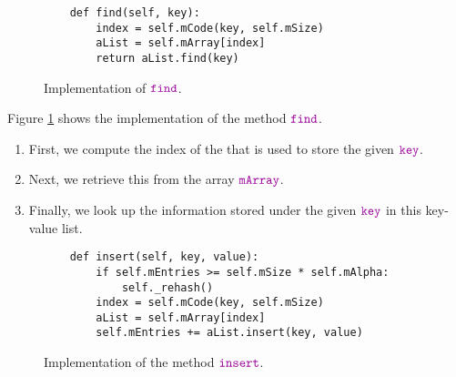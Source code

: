 \begin{figure}[!ht]
\centering
\begin{verbatim}
    def find(self, key):
        index = self.mCode(key, self.mSize)
        aList = self.mArray[index]
        return aList.find(key)
\end{verbatim}
\vspace*{-0.3cm}
\caption{Implementation of $\mytt{find}$.}
\label{fig:HashMap.ipynb-find}
\end{figure}

Figure \ref{fig:HashMap.ipynb-find} shows the implementation of the method $\mytt{find}$.
\begin{enumerate}
\item First, we compute the index of the  that is used to store the given
      $\mytt{key}$.
\item Next, we retrieve this  from the array $\mytt{mArray}$.
\item Finally, we look up the information stored under the given $\mytt{key}$ in this key-value list.
\end{enumerate}

\begin{figure}[!ht]
\centering
\begin{verbatim}
    def insert(self, key, value):
        if self.mEntries >= self.mSize * self.mAlpha:
            self._rehash()
        index = self.mCode(key, self.mSize)
        aList = self.mArray[index]
        self.mEntries += aList.insert(key, value)
\end{verbatim}
\vspace*{-0.3cm}
\caption{Implementation of the method $\mytt{insert}$.}
\label{fig:hashTable.ipython-insert}
\end{figure}

